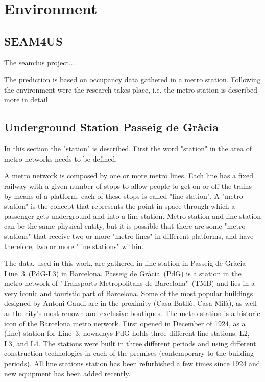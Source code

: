 \section{Environment}
\label{sec:Environment}

\subsection{SEAM4US}
\label{subsec:seam4us}

The seam4us project...

The prediction is based on occupancy data gathered in a metro station. Following the environment were the research takes place, i.e. the metro station is described more in detail.

\subsection{Underground Station Passeig de Gr\`{a}cia}
\label{subsec:station}

In this section the "station" is described. First the word "station" in the area of metro networks needs to be defined.

A metro network is composed by one or more metro lines. Each line has a fixed railway with a given number of stops to allow people to get on or off the trains by means of a platform: each of these stops is called "line station". A "metro station" is the concept that represents the point in space through which a passenger gets underground and into a line station. Metro station and line station can be the same physical entity, but it is possible that there are some "metro stations" that receive two or more "metro lines" in different platforms, and have therefore, two or more "line stations" within.

The data, used in this work, are gathered in line station in Passeig de Gr\`{a}cia - Line~3~(PdG-L3) in Barcelona. Passeig de Gr\`{a}cia~(PdG) is a station in the metro network of "Transports Metropolitans de Barcelona"~(TMB) and lies in a very iconic and touristic part of Barcelona. Some of the most popular buildings designed by Antoni Gaudi are in the proximity (Casa Batll\`{o}, Casa Mil\`{a}), as well as the city's most renown and exclusive boutiques.
The metro station is a historic icon of the Barcelona metro network. First opened in December of 1924, as a (line) station for Line~3, nowadays PdG holds three different line stations: L2, L3, and L4. The stations were built in three different periods and using different construction technologies in each of the premises (contemporary to the building periods). All line stations station has been refurbished a few times since 1924 and new equipment has been added recently.

